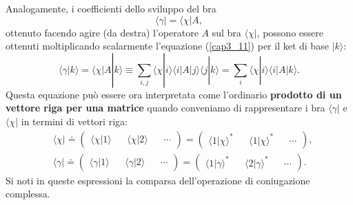 \documentclass[a4paper,12pt,oneside]{book}
\begin{document}
Analogamente, i coefficienti dello sviluppo del bra
	\begin{equation}
	\langle \gamma | = \langle \chi | A ,
	\end{equation}
ottenuto facendo agire (da destra) l'operatore $A$ sul bra $\langle \chi | $, possono essere ottenuti moltiplicando scalarmente l'equazione (\ref{cap3_11}) per il ket di base $| k \rangle$:
	\begin{equation}
	\langle \gamma | k \rangle = \langle \chi | A | k \rangle \equiv \sum \limits_{i,j}  \langle \chi | i \rangle \langle i | A | j \rangle  \langle j | k \rangle = \sum \limits_{i} \langle \chi | i \rangle  \langle i | A | k \rangle .
	\end{equation}
Questa equazione può essere ora interpretata come l'ordinario \textbf{prodotto di un vettore riga per una matrice} quando conveniamo di rappresentare i bra $ \langle \gamma |$ e  $\langle \chi |$ in termini di vettori riga:
	\begin{equation}
		\boxed{
		\begin{aligned}
			&\langle \chi | \doteq 
			\begin{pmatrix}
			\langle \chi | 1 \rangle && \langle \chi | 2 \rangle && \cdots 
			\end{pmatrix}
 			= 
			\begin{pmatrix}
			\langle 1 | \chi \rangle ^* && \langle 1 | \chi \rangle ^* && \cdots
			\end{pmatrix} ,
			\\
			& \langle \gamma | \doteq 
			\begin{pmatrix}
			\langle \gamma | 1 \rangle && \langle \gamma | 2 \rangle && \cdots 
			\end{pmatrix}
			 = 
			\begin{pmatrix}
			\langle 1 | \gamma \rangle ^* && \langle 2 | \gamma \rangle ^* && \cdots
			\end{pmatrix} .
		\end{aligned}
		}
	\end{equation}
Si noti in queste espressioni la comparsa dell'operazione di coniugazione complessa.\\
\end{document}
